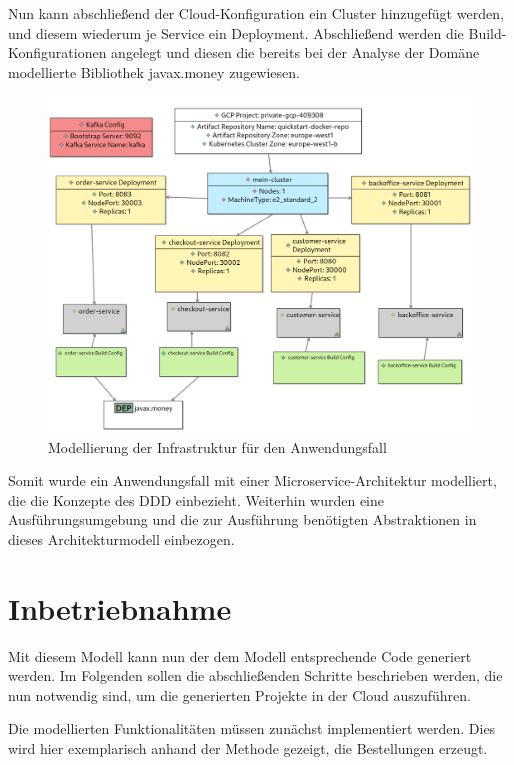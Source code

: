 \newpage

Nun kann abschließend der Cloud-Konfiguration ein Cluster hinzugefügt werden, und diesem wiederum je Service ein Deployment. Abschließend werden die Build-Konfigurationen angelegt und diesen die bereits bei der Analyse der Domäne modellierte Bibliothek \glqq javax.money\grqq{} zugewiesen.

\begin{figure}[ht]
\centering
\includegraphics[width=\textwidth]{bilder/k6/6.png}
\caption{Modellierung der Infrastruktur für den Anwendungsfall}
\end{figure}

Somit wurde ein Anwendungsfall mit einer Microservice-Architektur modelliert, die die Konzepte des DDD einbezieht. Weiterhin wurden eine Ausführungsumgebung und die zur Ausführung benötigten Abstraktionen in dieses Architekturmodell einbezogen.

\newpage

\section{Inbetriebnahme}

Mit diesem Modell kann nun der dem Modell entsprechende Code generiert werden. Im Folgenden sollen die abschließenden Schritte beschrieben werden, die nun notwendig sind, um die generierten Projekte in der Cloud auszuführen.

Die modellierten Funktionalitäten müssen zunächst implementiert werden. Dies wird hier exemplarisch anhand der Methode gezeigt, die Bestellungen erzeugt.

